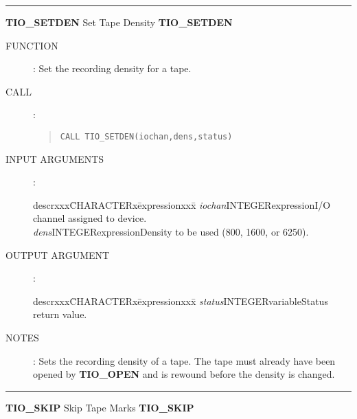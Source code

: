 \goodbreak
\rule{\textwidth}{0.3mm}
{\Large {\bf TIO\_SETDEN} \hfill Set Tape Density \hfill {\bf TIO\_SETDEN}}
\begin{description}
\item [FUNCTION]:
Set the recording density for a tape.
\item [CALL]:
\begin{quote}
{\tt CALL TIO\_SETDEN(iochan,dens,status)}
\end{quote}
\item [INPUT ARGUMENTS]:
\begin{tabbing}
descrxxx\=CHARACTERx\=expressionxxx\=\kill
{\em iochan}\>INTEGER\>expression\>I/O channel assigned to device.\\
{\em dens}\>INTEGER\>expression\>Density to be used (800, 1600, or 6250).
\end{tabbing}
\item [OUTPUT ARGUMENT]:
\begin{tabbing}
descrxxx\=CHARACTERx\=expressionxxx\=\kill
{\em status}\>INTEGER\>variable\>Status return value.
\end{tabbing}
\item [NOTES]:
Sets the recording density of a tape.
The tape must already have been opened by {\bf TIO\_OPEN} and is rewound
before the density is changed.
\end{description}
\goodbreak
\rule{\textwidth}{0.3mm}
{\Large {\bf TIO\_SKIP} \hfill Skip Tape Marks \hfill {\bf TIO\_SKIP}}
